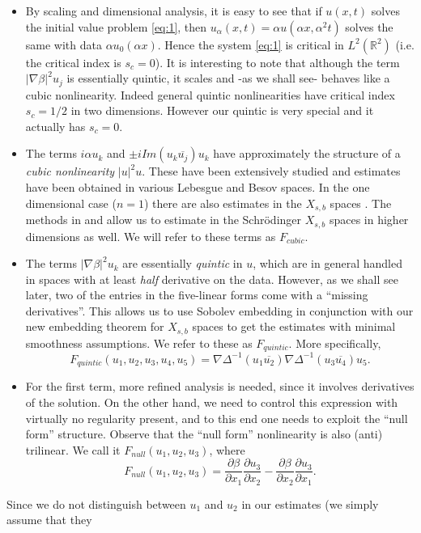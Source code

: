\documentclass[draft,11pt,leqno]{amsart}
\newcommand{\al}{\alpha}
\newcommand{\De}{\Delta}
\newcommand{\rtwo}{\mathbb R^2}
\newcommand{\f}{\displaystyle\frac}
\newcommand{\p}{\partial}
\newcommand{\pp}[2]{\f{\p #1}{\p #2}}
\begin{document}
\begin{itemize}
\item By scaling and dimensional analysis, it is easy to see that if 
$u(x,t)$ solves the initial value problem \eqref{eq:1}, then 
$u_\al(x,t)=\al u(\al x,\al^2t)$ solves the same with data 
$\al u_0(\al x)$. Hence the system \eqref{eq:1} is critical in 
$L^2(\rtwo)$ (i.e. the critical index is $s_c=0$). It is interesting to note
that although the term $|\nabla\beta|^2 u_j$ is essentially quintic, it scales 
and -as we shall see- behaves like a cubic nonlinearity. Indeed general quintic
nonlinearities have critical index $s_c=1/2$ in two dimensions. However our quintic is very special and it actually has $s_c=0$.
\item The terms $i\al u_k$ and
$\pm iIm(u_k\overline{u_j})u_k$  have
approximately the structure of a {\it cubic nonlinearity} $|u|^2 u$. 
These have been extensively studied and estimates have been obtained in 
various Lebesgue and Besov spaces. In the one dimensional case ($n=1$) 
there are also estimates in the $X_{s,b}$ spaces \cite{KPV2}. 
The methods in  \cite{Kenig} and \cite{Tao} allow us 
to estimate in the Schr\"odinger $X_{s,b}$ spaces in higher dimensions as well. We will refer to these terms as $F_{cubic}$.
\item The terms $|\nabla \beta|^2 u_k$ are essentially {\it quintic} in $u$, 
which are in general  handled in  spaces with at least {\it half} 
derivative on the data.  However, as we shall see later, two of the
entries in the five-linear forms come with a ``missing derivatives''. This
allows us to use Sobolev embedding in conjunction with our new embedding
theorem for $X_{s,b}$ spaces to get the estimates with minimal 
smoothness assumptions.
We refer to these as $F_{quintic}$. More specifically,
$$
F_{quintic}(u_1,u_2,u_3,u_4,u_5)=\nabla \De^{-1}(u_1\overline{u_2})
\nabla \De^{-1}(u_3\overline{u_4})u_5.
$$ 
\item
For the first term, more refined analysis is needed,
since it involves derivatives of the solution. On the other hand, 
we need to  control this
expression with  virtually no regularity present, 
and to this end one needs to  exploit the ``null form'' structure. 
Observe that the ``null form'' nonlinearity is also (anti) trilinear.
We call it $F_{null}(u_1,u_2,u_3)$, where 
$$
F_{null}(u_1,u_2,u_3)=\pp{\beta}{x_1}\pp{u_3}{x_2}-
\pp{\beta}{x_2}\pp{u_3}{x_1}.
$$
\end{itemize}
Since we
do not distinguish between $u_1$ and $u_2$ in our estimates 
(we simply assume that they 
\end{document}
